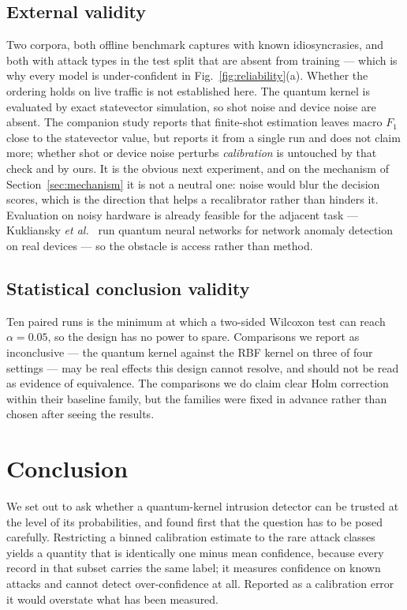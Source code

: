 \documentclass[journal]{IEEEtran}
\begin{document}
\subsection{External validity}
Two corpora, both offline benchmark captures with known idiosyncrasies, and
both with attack types in the test split that are absent from training ---
which is why every model is under-confident in
Fig.~\ref{fig:reliability}(a). Whether the ordering holds on live traffic is
not established here. The quantum kernel is evaluated by exact statevector
simulation, so shot noise and device noise are absent. The companion study
reports that finite-shot estimation leaves macro $F_1$ close to the
statevector value, but reports it from a single run and does not claim more;
whether shot or device noise perturbs \emph{calibration} is untouched by
that check and by ours. It is the obvious next experiment, and on the
mechanism of Section~\ref{sec:mechanism} it is not a neutral one: noise
would blur the decision scores, which is the direction that helps a
recalibrator rather than hinders it. Evaluation on noisy hardware is
already feasible for the adjacent task --- Kukliansky \emph{et
al.}~\cite{kukliansky2024qnn} run quantum neural networks for network
anomaly detection on real devices --- so the obstacle is access rather than
method.

\subsection{Statistical conclusion validity}
Ten paired runs is the minimum at which a two-sided Wilcoxon test can reach
$\alpha=0.05$, so the design has no power to spare. Comparisons we report as
inconclusive --- the quantum kernel against the RBF kernel on three of four
settings --- may be real effects this design cannot resolve, and should not
be read as evidence of equivalence. The comparisons we do claim clear Holm
correction within their baseline family, but the families were fixed in
advance rather than chosen after seeing the results.

\section{Conclusion}\label{sec:conclusion}

We set out to ask whether a quantum-kernel intrusion detector can be trusted
at the level of its probabilities, and found first that the question has to
be posed carefully. Restricting a binned calibration estimate to the rare
attack classes yields a quantity that is identically one minus mean
confidence, because every record in that subset carries the same label; it
measures confidence on known attacks and cannot detect over-confidence at
all. Reported as a calibration error it would overstate what has been
measured.
\end{document}
